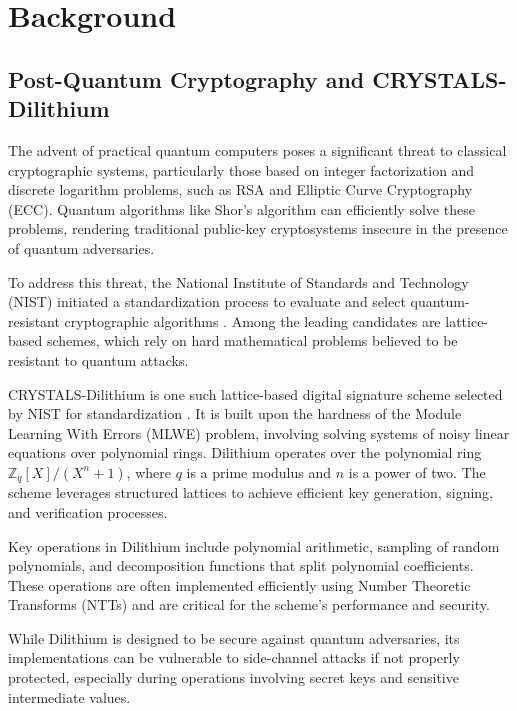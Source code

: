 
\chapter{Background}
\thispagestyle{chapterstart}

\section{Post-Quantum Cryptography and CRYSTALS-Dilithium}

The advent of practical quantum computers poses a significant threat to classical cryptographic systems, particularly those based on integer factorization and discrete logarithm problems, such as RSA and Elliptic Curve Cryptography (\ac{ECC}). Quantum algorithms like Shor's algorithm can efficiently solve these problems, rendering traditional public-key cryptosystems insecure in the presence of quantum adversaries.

To address this threat, the National Institute of Standards and Technology (\ac{NIST}) initiated a standardization process to evaluate and select quantum-resistant cryptographic algorithms \cite{NIST24}. Among the leading candidates are lattice-based schemes, which rely on hard mathematical problems believed to be resistant to quantum attacks.

CRYSTALS-Dilithium is one such lattice-based digital signature scheme selected by NIST for standardization \cite{NIST24}. It is built upon the hardness of the Module Learning With Errors (MLWE) problem, involving solving systems of noisy linear equations over polynomial rings. Dilithium operates over the polynomial ring $\mathbb{Z}_q[X]/(X^n + 1)$, where $q$ is a prime modulus and $n$ is a power of two. The scheme leverages structured lattices to achieve efficient key generation, signing, and verification processes.

Key operations in Dilithium include polynomial arithmetic, sampling of random polynomials, and decomposition functions that split polynomial coefficients. These operations are often implemented efficiently using Number Theoretic Transforms (NTTs) and are critical for the scheme's performance and security.

While Dilithium is designed to be secure against quantum adversaries, its implementations can be vulnerable to side-channel attacks if not properly protected, especially during operations involving secret keys and sensitive intermediate values.

